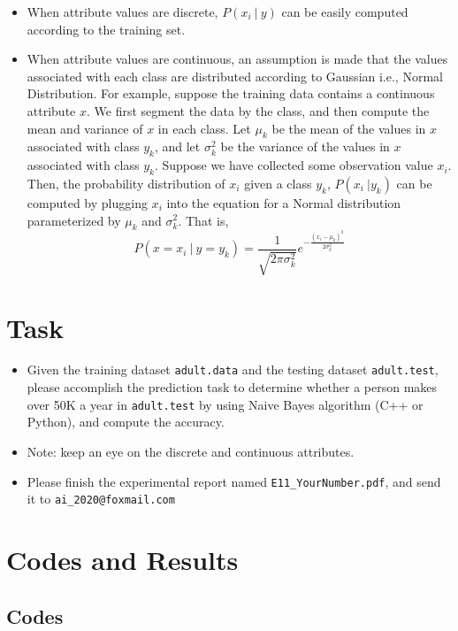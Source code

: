 \documentclass[a4paper, 11pt]{article}
\begin{document}
\begin{itemize}
	\item When attribute values are discrete, $P(x_i\ |\ y)$ can be easily computed according to the training set.
	\item When attribute values are continuous, an assumption is made that the values associated with each class are distributed according to Gaussian i.e., Normal Distribution. For example, suppose the training data contains a continuous attribute $x$. We first segment the data by the class, and then compute the mean and variance of $x$ in each class. Let $\mu_k$ be the mean of the values in $x$ associated with class $y_k$, and let $\sigma_k^2$ be the variance of the values in $x$ associated with class $y_k$. Suppose we have collected some observation value $x_i$. Then, the probability distribution of $x_i$ given a class $y_k$, $P(x_i\ | y_k)$ can be computed by plugging $x_i$ into the equation for a Normal distribution parameterized by $\mu_k$ and $\sigma_k^2$. That is,
	$$P(x=x_i\ |\ y=y_k)=\frac{1}{\sqrt{2\pi\sigma_k^2}}e^{-\frac{(x_i-\mu_k)^2}{2\sigma_k^2}}$$
    
\end{itemize}

\section{Task}
\begin{itemize}
\item Given the training dataset \texttt{adult.data} and the testing dataset \texttt{adult.test}, please accomplish the prediction task to determine whether a person makes over 50K a year in \texttt{adult.test} by using Naive Bayes algorithm (C++ or Python), and compute the accuracy. 
\item Note: keep an eye on the discrete and continuous attributes.
\item Please finish the experimental report named \texttt{E11\_YourNumber.pdf}, and send it to \texttt{ai\_2020@foxmail.com}
\end{itemize}

\section{Codes and Results}
\subsection{Codes}
\end{document}
